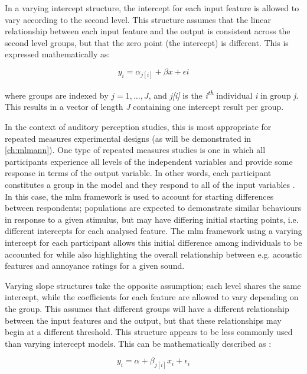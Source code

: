 In a varying intercept structure, the intercept for each input feature is allowed to vary according to the second level. This structure assumes that the linear relationship between each input feature and the output is consistent across the second level groups, but that the zero point (the intercept) is different. This is expressed mathematically \citep{DataAnalysisUsingGelman} as:

\begin{equation}
  y_i = \alpha_{j[i]} + \beta x + \epsilon{i}
\end{equation}

where groups are indexed by $j = 1, \ldots, J$, and \emph{j[i]} is the \emph{i\textsuperscript{th}} individual \emph{i} in group \emph{j}. This results in a vector of length \emph{J} containing one intercept result per group.

In the context of auditory perception studies, this is most appropriate for repeated measures experimental designs (as will be demonstrated in \cref{ch:mlmann}). One type of repeated measures studies is one in which all participants experience all levels of the independent variables and provide some response in terms of the output variable. In other words, each participant constitutes a group in the model and they respond to all of the input variables \citep{Kristjansson2007Multilevel}. In this case, the \gls{mlm} framework is used to account for starting differences between respondents; populations are expected to demonstrate similar behaviours in response to a given stimulus, but may have differing initial starting points, i.e. different intercepts for each analysed feature. The \gls{mlm} framework using a varying intercept for each participant allows this initial difference among individuals to be accounted for while also highlighting the overall relationship between e.g. acoustic features and annoyance ratings for a given sound. 

Varying slope structures take the opposite assumption; each level shares the same intercept, while the coefficients for each feature are allowed to vary depending on the group. This assumes that different groups will have a different relationship between the input features and the output, but that these relationships may begin at a different threshold. This structure appears to be less commonly used than varying intercept models. This can be mathematically described as \citep{DataAnalysisUsingGelman}:

\begin{equation}
  y_i = \alpha + \beta_{j[i]}x_i + \epsilon_i
\end{equation}


